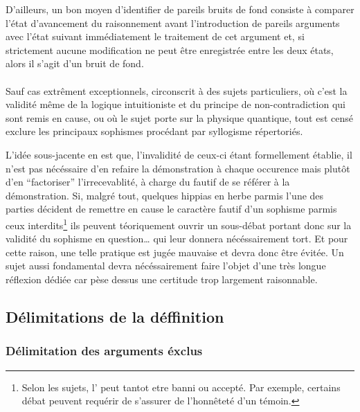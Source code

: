 D’ailleurs, un bon moyen d’identifier de pareils bruits de fond consiste à comparer l’état d’avancement du raisonnement avant l’introduction de pareils arguments avec l’état suivant immédiatement le traitement de cet argument et, si strictement aucune modification ne peut être enregistrée entre les deux états, alors il s’agit d’un bruit de fond.

\paragraph{}
Sauf cas extrêment exceptionnels, circonscrit à des sujets particuliers, où c’est la validité même de la logique intuitioniste et du principe de non-contradiction qui sont remis en cause, ou où le sujet porte sur la physique quantique, tout \mainabbr{} est censé exclure les principaux sophismes procédant par syllogisme répertoriés.

L’idée sous-jacente en est que, l’invalidité de ceux-ci étant formellement établie, il n’est pas nécéssaire d’en refaire la démonstration à chaque occurence mais plutôt d’en \enquote{factoriser} l’irrecevablité, à charge du fautif de se référer à la démonstration. Si, malgré tout, quelques hippias en herbe parmis l’une des parties décident de remettre en cause le caractère fautif d’un sophisme parmis ceux interdits\footnote{Selon les sujets, l’ peut tantot etre banni ou accepté. Par exemple, certains débat peuvent requérir de s’assurer de l’honnêteté d’un témoin.} ils peuvent téoriquement ouvrir un sous-débat portant donc sur la validité du sophisme en question… qui leur donnera nécéssairement tort. Et pour cette raison, une telle pratique est jugée mauvaise et devra donc être évitée. Un sujet aussi fondamental devra nécéssairement faire l’objet d’une très longue réflexion dédiée car pèse dessus une certitude trop largement raisonnable.

\subsection{Délimitations de la déffinition}
\subsubsection{Délimitation des arguments éxclus}
